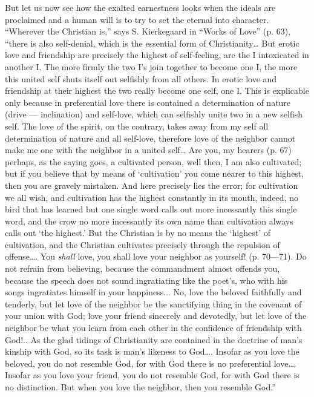 \documentclass[12pt,a4paper,openany]{book}
\newcommand{\opage}[1]{\marginnote{\footnotesize\textit{[#1]}}}
\begin{document}
But let us now see how the exalted earnestness
looks when the ideals are proclaimed and a human
will is to try to set the eternal into character.
``Wherever the Christian is,'' says S. Kierkegaard in
``Works of Love'' (p. 63), ``there is also self-denial,
which is the essential form of Christianity\dots{} But
erotic love and friendship are precisely the highest of self-feeling, are
the I intoxicated in another I. The more firmly the two I's
join together to become one I, the more
\setcounter{footnote}{0}%
\opage{507}this united self shuts itself out selfishly from all others. In erotic love
and friendship at their highest the two really become one
self, one I. This is explicable only because in preferential love
there is contained a determination of nature (drive --- inclination)
and self-love, which can selfishly unite two
in a new selfish self. The love of the spirit, on the contrary, takes away
from my self all determination of nature and all self-love,
therefore love of the neighbor cannot make me
one with the neighbor in a united self\dots{} Are you, my hearers
(p. 67) perhaps, as the saying goes, a cultivated person, well then, I
am also cultivated; but if you believe that by means of
`cultivation' you come nearer to this highest, then
you are gravely mistaken. And here precisely lies the error; for
cultivation we all wish, and cultivation has the
highest constantly in its mouth, indeed, no bird that has learned but one
single word calls out more incessantly this single word,
and the crow no more incessantly its own name than
cultivation always calls out `the highest.' But the Christian
is by no means the `highest' of cultivation, and the Christian
cultivates precisely through the repulsion of offense\dots{}. You
\emph{shall} love, you shall love your neighbor as yourself! (p.
70---71). Do not refrain from believing, because the commandment almost offends
you, because the speech does not sound ingratiating like the poet's,
who with his songs ingratiates himself in your happiness...
No, love the beloved faithfully and tenderly, but let love
of the neighbor be the sanctifying thing in the covenant
of your union with God; love your friend sincerely and devotedly, but
let love of the neighbor be what you learn from each other
in the confidence of friendship with God!.. 
As the glad tidings of Christianity
are contained in the doctrine of man's
kinship with God, so its task is
\setcounter{footnote}{0}%
\opage{508}man's likeness to God\dots{}. Insofar as you love the
beloved, you do not resemble God, for with God there is no preferential love\dots{}.
Insofar as you love your friend, you do not
resemble God, for with God there is no distinction. But when
you love the neighbor, then you resemble God.''
\end{document}
